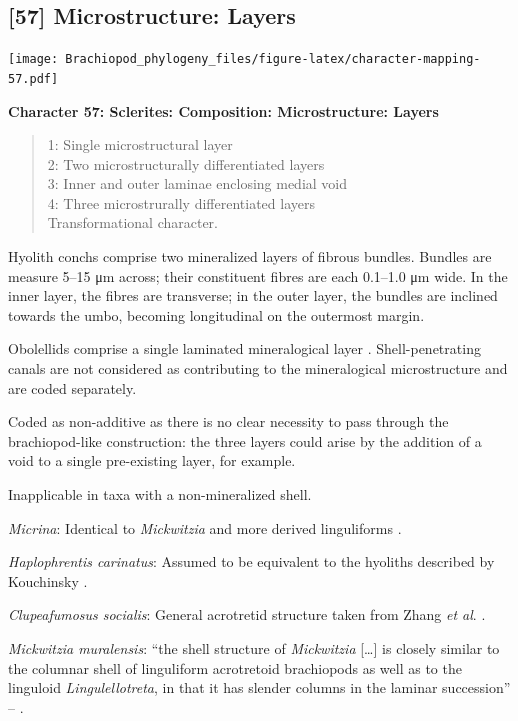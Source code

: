 \documentclass[]{book}
\theoremstyle{definition}
\theoremstyle{definition}
\theoremstyle{definition}
\theoremstyle{remark}
\begin{document}
\hypertarget{microstructure-layers}{%
\subsection*{{[}57{]} Microstructure:
Layers}\label{microstructure-layers}}

\texttt{[image: Brachiopod\_phylogeny\_files/figure-latex/character-mapping-57.pdf]}

\textbf{Character 57: Sclerites: Composition: Microstructure: Layers}

\begin{quote}
1: Single microstructural layer\\
2: Two microstructurally differentiated layers\\
3: Inner and outer laminae enclosing medial void\\
4: Three microstrurally differentiated layers\\
Transformational character.
\end{quote}

Hyolith conchs comprise two mineralized layers of fibrous bundles.
Bundles are measure 5--15 μm across; their constituent fibres are each
0.1--1.0 μm wide. In the inner layer, the fibres are transverse; in the
outer layer, the bundles are inclined towards the umbo, becoming
longitudinal on the outermost margin.

Obolellids comprise a single laminated mineralogical layer
\citep{Balthasar2008iMummpikia}. Shell-penetrating canals are not
considered as contributing to the mineralogical microstructure and are
coded separately.

Coded as non-additive as there is no clear necessity to pass through the
brachiopod-like construction: the three layers could arise by the
addition of a void to a single pre-existing layer, for example.

Inapplicable in taxa with a non-mineralized shell.

\emph{Micrina}: Identical to \emph{Mickwitzia} and more derived
linguliforms \citep{Holmer2011Firstrecord}.

\emph{Haplophrentis carinatus}: Assumed to be equivalent to the hyoliths
described by Kouchinsky
\citeyearpar{Kouchinsky2000Skeletalmicrostructures}.

\emph{Clupeafumosus socialis}: General acrotretid structure taken from
Zhang \emph{et al}. \citeyearpar{Zhang2016Epithelialcell}.

\emph{Mickwitzia muralensis}: ``the shell structure of \emph{Mickwitzia}
{[}\ldots{}{]} is closely similar to the columnar shell of linguliform
acrotretoid brachiopods as well as to the linguloid
\emph{Lingulellotreta}, in that it has slender columns in the laminar
succession'' -- \citet{Williams2007PartH}.
\end{document}
